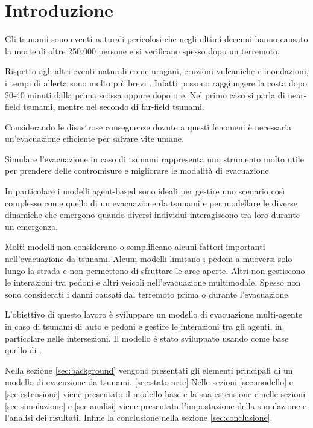 \section{Introduzione}
Gli tsunami sono eventi naturali pericolosi che negli ultimi decenni 
hanno causato la morte di oltre 250.000 persone e si verificano spesso 
dopo un terremoto.

Rispetto agli altri eventi naturali come uragani, eruzioni vulcaniche e inondazioni, 
i tempi di allerta sono molto più brevi \parencite{katada2006integrated}.
%
Infatti possono raggiungere la costa dopo 20-40 minuti dalla prima scossa oppure dopo ore.
Nel primo caso si parla di near-field tsunami, mentre nel secondo di far-field tsunami. 

Considerando le disastrose conseguenze dovute a questi fenomeni è necessaria un'evacuazione efficiente per salvare vite umane. 

Simulare l'evacuazione in caso di tsunami rappresenta uno strumento molto utile per 
prendere delle contromisure e migliorare le modalità di evacuazione.

In particolare i modelli agent-based sono ideali per gestire uno scenario così complesso come quello di un evacuazione da tsunami e
per modellare le diverse dinamiche che emergono quando diversi individui interagiscono tra loro durante un emergenza. 

Molti modelli non considerano o semplificano alcuni fattori importanti nell'evacuazione da tsunami.
Alcuni modelli limitano i pedoni a muoversi solo lungo la strada e non permettono di sfruttare le aree aperte. 
Altri non gestiscono le interazioni tra pedoni e altri veicoli nell'evacuazione multimodale.
%
Spesso non sono considerati i danni causati dal terremoto prima o durante l'evacuazione.

L'obiettivo di questo lavoro è sviluppare un modello di evacuazione multi-agente in caso di tsunami
di auto e pedoni e gestire le interazioni tra gli agenti, 
in particolare nelle intersezioni.
%
Il modello é stato sviluppato usando come base quello di \textcite{mostafizi2019agent}.


Nella sezione \ref{sec:background} vengono presentati gli elementi principali di un modello di evacuzione da tsunami.
\ref{sec:stato-arte}
%
Nelle sezioni \ref{sec:modello} e \ref{sec:estensione} viene presentato il modello base e la sua estensione e 
nelle sezioni \ref{sec:simulazione} e \ref{sec:analisi} viene presentata l'impostazione della simulazione e 
l'analisi dei risultati.
%
Infine la conclusione nella sezione \ref{sec:conclusione}.

\newpage
